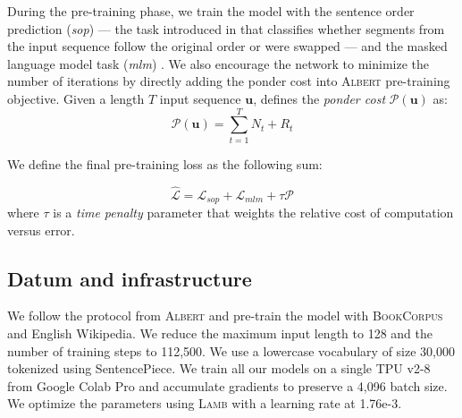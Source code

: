 During the pre-training phase, we train the model with the sentence order prediction (\textit{sop}) — the task introduced in \textcite{lan_20} that classifies whether segments from the input sequence follow the original order or were swapped — and the masked language model task (\textit{mlm}) \parencite{devlin_19}. We also encourage the network to minimize the number of iterations by directly adding the ponder cost into \textsc{Albert}  pre-training objective. Given a length $T$ input sequence $\textbf{u}$,  \textcite{graves_16} defines the \emph{ponder cost} $\mathcal{P}(\textbf{u})$ as:
\begin{equation}
\mathcal{P}(\textbf{u}) = \sum_{t=1}^T N_{t} + R_t \label{eq:ponder-cost}
\end{equation}

We define the final pre-training loss as the following sum:

\begin{equation}
\hat{\mathcal{L}} = \mathcal{L}_{sop} + \mathcal{L}_{mlm} + \tau \mathcal{P} \label{eq:ponder-loss}
\end{equation}
where $\tau$ is a \emph{time penalty} parameter that weights the relative cost of computation versus error.

\subsection{Datum and infrastructure} We follow the protocol from \textsc{Albert} and pre-train the model with \textsc{BookCorpus}~\parencite{zhu_15} and English Wikipedia. We reduce the maximum input length to 128 and the number of training steps to 112,500. We use a lowercase vocabulary of size 30,000 tokenized using SentencePiece. We train all our models on a single TPU v2-8 from Google Colab Pro and accumulate gradients to preserve a 4,096 batch size. We optimize the parameters using \textsc{Lamb} with a learning rate at 1.76e-3.

